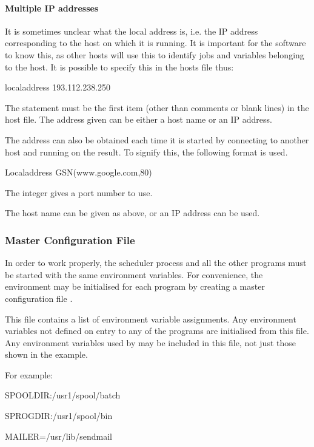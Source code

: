 \paragraph{Multiple IP addresses}
It is sometimes unclear what the local address is, i.e. the IP address corresponding to the host on which it is running. It is important for
the software to know this, as other hosts will use this to identify jobs and variables belonging to the host. It is possible to specify
this in the hosts file thus:

\begin{expara}

localaddress 193.112.238.250

\end{expara}

The  statement must be the first item (other than comments or blank lines) in the host file. The address
given can be either a host name or an IP address.

The address can also be obtained each time it is started by connecting to another host and running  on the
result. To signify this, the following format is used.

\begin{expara}

Localaddress GSN(www.google.com,80)

\end{expara}

The integer gives a port number to use.

The host name can be given as above, or an IP address can be used.

\subsubsection{\manualProduct{} Master Configuration File}
In order to work properly, the scheduler process and all the other programs must be started with the same environment variables. For
convenience, the environment may be initialised for each program by creating a master configuration file \masterconfig.

This file contains a list of environment variable assignments. Any environment variables not defined on entry to any of the programs are
initialised from this file. Any environment variables used by \ProductName{} may be included in this file, not just those shown in the example.

For example:

\begin{expara}

SPOOLDIR:/usr1/spool/batch

SPROGDIR:/usr1/spool/bin

MAILER=/usr/lib/sendmail

\end{expara}

